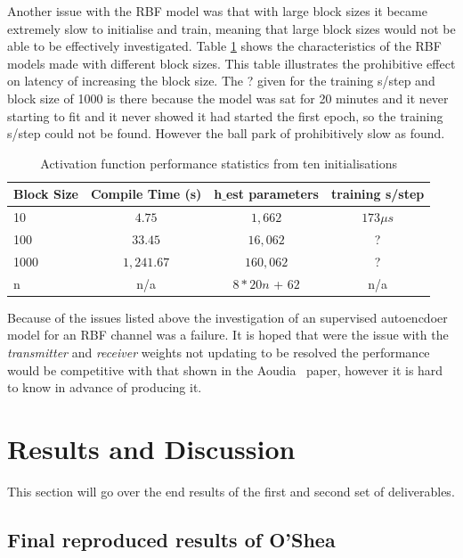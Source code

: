 \documentclass[12pt,onecolumn,letterpaper]{article}
\newcommand{\code}{\textit}
\begin{document}
Another issue with the RBF model was that with large block sizes it became extremely slow to initialise and train, meaning that large block sizes would not be able to be effectively investigated. Table \ref{tab:RbfBlockSizeChars} shows the characteristics of the RBF models made with different block sizes. This table illustrates the prohibitive effect on latency of increasing the block size. The ? given for the training s/step and block size of 1000 is there because the model was sat for 20 minutes and it never starting to fit and it never showed it had started the first epoch, so the training s/step could not be found. However the ball park of prohibitively slow as found.

\begin{table}[H]
   \begin{center}
   \begin{tabular}{|l|c|c|c|}
   \hline
   Block Size & Compile Time (s) & h$\_$est parameters & training s/step\\
   \hline\hline
   10 & $4.75$ & $1,662$ & $173\mu s$ \\
   100 & $33.45$ & $16,062$ & ? \\
   1000 & $1,241.67$ & $160,062$ & ? \\
   n & n/a& $8*20n$ + $62$ & n/a \\
   \hline
   \end{tabular}
   \end{center}
   \caption{Activation function performance statistics from ten initialisations}
   \label{tab:RbfBlockSizeChars}
\end{table}

Because of the issues listed above the investigation of an supervised autoencdoer model for an RBF channel was a failure. It is hoped that were the issue with the \code{transmitter} and \code{receiver} weights not updating to be resolved the performance would be competitive with that shown in the Aoudia~\cite{Aoudia} paper, however it is hard to know in advance of producing it. 

\FloatBarrier
\section{Results and Discussion}

This section will go over the end results of the first and second set of deliverables. 

\subsection{Final reproduced results of O'Shea \etal}
\end{document}
